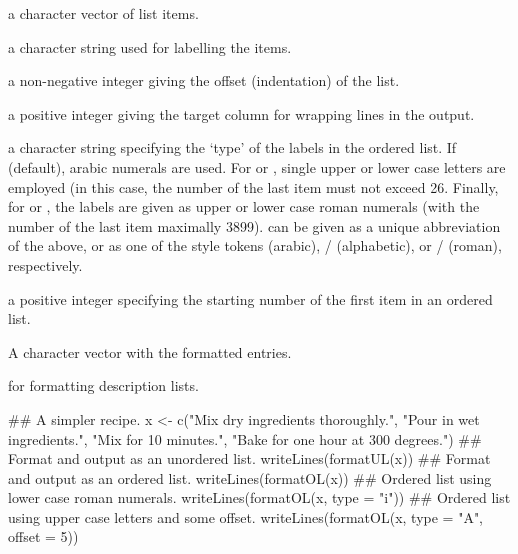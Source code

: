 \begin{Arguments}
\begin{ldescription}
\item[\code{x}] a character vector of list items.
\item[\code{label}] a character string used for labelling the items.
\item[\code{offset}] a non-negative integer giving the offset (indentation)
of the list.
\item[\code{width}] a positive integer giving the target column for wrapping
lines in the output.
\item[\code{type}] a character string specifying the `type' of the
labels in the ordered list.  If  (default), arabic
numerals are used.  For  or , single upper
or lower case letters are employed (in this case, the number of the
last item must not exceed 26.  Finally, for  or
, the labels are given as upper or lower case roman
numerals (with the number of the last item maximally 3899).
 can be given as a unique abbreviation of the above, or
as one of the  style tokens  (arabic),
/ (alphabetic), or /
(roman), respectively.
\item[\code{start}] a positive integer specifying the starting number of the
first item in an ordered list.
\end{ldescription}
\end{Arguments}
%
\begin{Value}
A character vector with the formatted entries.
\end{Value}
%
\begin{SeeAlso}\relax
{} for formatting description lists.
\end{SeeAlso}
%
\begin{Examples}
\begin{ExampleCode}
## A simpler recipe.
x <- c("Mix dry ingredients thoroughly.",
       "Pour in wet ingredients.",
       "Mix for 10 minutes.",
       "Bake for one hour at 300 degrees.")
## Format and output as an unordered list.
writeLines(formatUL(x))
## Format and output as an ordered list.
writeLines(formatOL(x))
## Ordered list using lower case roman numerals.
writeLines(formatOL(x, type = "i"))
## Ordered list using upper case letters and some offset.
writeLines(formatOL(x, type = "A", offset = 5))
\end{ExampleCode}
\end{Examples}
